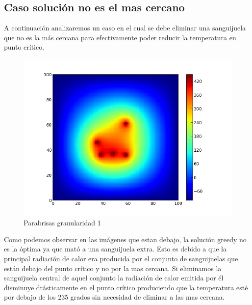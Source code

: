 \subsection{Caso solución no es el mas cercano}

A continuación analizaremos un caso en el cual se debe eliminar una sanguijuela que no es la más cercana para efectivamente poder reducir la temperatura en punto crítico.
\begin{figure}[htb]
\begin{center}
\includegraphics[scale=0.40]{imagenes/test6.png} 
\caption{Parabrisas granularidad 1} 
\end{center}
\end{figure}

Como podemos observar en las imágenes que estan debajo, la solución greedy no es la óptima ya que mató a una sanguijuela extra. Esto es debido a que la principal radiación de calor era producida por el conjunto de 
sanguijuelas que están debajo del punto crítico y no por la mas cercana. Si eliminamos la sanguijuela central de aquel conjunto la radiación de calor emitida por él disminuye drásticamente en el punto crítico produciendo 
que la temperatura esté por debajo de los 235 grados sin necesidad de eliminar a las mas cercana. 

